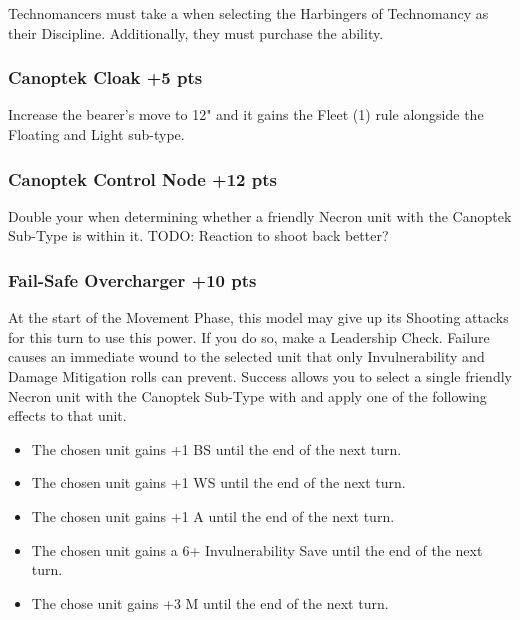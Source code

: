 Technomancers must take a  when selecting the Harbingers of Technomancy as their Discipline. Additionally, they must purchase the  ability.

\subsubsection[Canoptek Cloak ]{Canoptek Cloak  \hrulefill +5 pts}

Increase the bearer's move to 12" and it gains the Fleet (1) rule alongside the Floating and Light sub-type.

\subsubsection[Canoptek Control Node ]{Canoptek Control Node  \hrulefill +12 pts}

Double your  when determining whether a friendly Necron unit with the Canoptek Sub-Type is within it. TODO: Reaction to shoot back better?

\subsubsection[Fail-Safe Overcharger ]{Fail-Safe Overcharger  \hrulefill +10 pts}

At the start of the Movement Phase, this model may give up its Shooting attacks for this turn to use this power. If you do so, make a Leadership Check. Failure causes an immediate wound to the selected unit that only Invulnerability and Damage Mitigation rolls can prevent. Success allows you to select a single friendly Necron unit with the Canoptek Sub-Type with  and apply one of the following effects to that unit.

\begin{itemize}
	\item The chosen unit gains +1 BS until the end of the next turn.
	\item The chosen unit gains +1 WS until the end of the next turn.
	\item The chosen unit gains +1 A until the end of the next turn.
	\item The chosen unit gains a 6+ Invulnerability Save until the end of the next turn.
	\item The chose unit gains +3 M until the end of the next turn.
\end{itemize}

